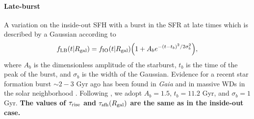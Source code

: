 \documentclass[twocolumn,twocolappendix,linenumbers]{aastex631}
\begin{document}
\paragraph{Late-burst} A variation on the inside-out SFH with a burst in the SFR at late times which is described by a Gaussian according to
\begin{equation}
    f_{\rm LB}(t|R_{\rm gal}) = f_{\rm IO}(t|R_{\rm gal}) \Big(1 + A_b e^{-(t-t_b)^2/2\sigma_b^2} \Big),
    \label{eq:lateburst-sfh}
\end{equation}
where $A_b$ is the dimensionless amplitude of the starburst, $t_b$ is the time of the peak of the burst, and $\sigma_b$ is the width of the Gaussian. 
Evidence for a recent star formation burst $\sim 2-3$ Gyr ago has been found in {\it Gaia} \citep{Mor2019-Starburst} and in massive WDs in the solar neighborhood \citep{Isern2019-Starburst}.
Following , we adopt $A_b=1.5$, $t_b=11.2$ Gyr, and $\sigma_b=1$ Gyr. {\bf The values of $\tau_{\rm rise}$ and $\tau_{\rm sfh}(R_{\rm gal})$ are the same as in the inside-out case.}
\end{document}
